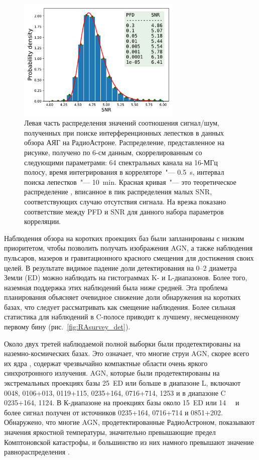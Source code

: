 \begin{figure}[tbh]
    \centering
    \includegraphics[width=0.7\textwidth,trim=0cm 0.5cm 0cm 0cm]{SNR_hist_C_64ch_05s_570s.pdf}
    \caption{Левая часть распределения значений соотношения сигнал/шум, полученных при поиске
интерференционных лепестков в данных обзора АЯГ на РадиоАстроне. Распределение, представленное на
рисунке, получено по 6-см данным, скоррелированным со следующими параметрами: 64 спектральных
канала на 16-МГц полосу, время интегрирования в корреляторе~"--- \SI{0.5}{\second}, интервал поиска
лепестков~"--- \SI{10}{\minute}.
Красная кривая~"--- это теоретическое распределение \cite{VLBIbook}, вписанное в пик распределения
малых SNR, соответствующих случаю отсутствия сигнала.
На врезка показано соответствие между PFD и SNR для данного набора параметров корреляции.}
    \label{fig:RAsurvey_pfd}
\end{figure}

Наблюдения обзора на коротких проекциях баз были запланированы с низким приоритетом,
чтобы позволить получать изображения AGN, а также наблюдения пульсаров, мазеров и гравитационного
красного смещения для достижения своих целей. В результате видимое падение доли детектирования на
0--2 диаметра Земли (ED) можно наблюдать на гистограммах K- и L-диапазонов. Более того, наземная
поддержка этих наблюдений была ниже средней. Эта проблема планирования объясняет очевидное снижение
доли обнаружения на коротких базах, что следует рассматривать как смещение наблюдения.
Более сильная статистика для наблюдений в C-полосе приводит к лучшему, несмещенному первому бину
(рис.~\ref{fig:RAsurvey_det}).

Около двух третей наблюдаемой полной выборки были продетектированы на наземно-космических базах. Это
означает, что многие струи AGN, скорее всего их ядра \cite{Kovalev_2005}, содержат чрезвычайно
компактные области очень яркого синхротронного излучения. AGN, которые были продетектированы на
экстремальных проекциях базы 25~ED или больше в диапазоне L, включают 0048, 0106+013,
0119+115, 0235+164, 0716+714, 1253 и в диапазоне C 0235+164, 1124. В
К-диапазоне на проекциях базы около 15~ED или \SI{14}{\giga\la} и более сигнал получен от источников
0235+164, 0716+714 и 0851+202. Обнаружено, что многие AGN, продетектированные РадиоАстроном,
показывают значения яркостной температуры, значительно превышающие предел Комптоновской катастрофы,
и большинство из них намного превышают значение равнораспределения
\cite{Kellermann_1969,Readhead_1994}.
